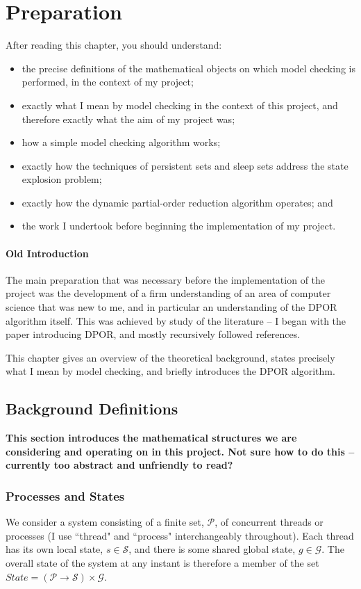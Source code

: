 \documentclass[12pt,a4paper,twoside,openright]{report}
\newenvironment{understandinglist}
	{\begin{itemize} \itemsep 0em}{\end{itemize}}
\begin{document}
\chapter{Preparation}
After reading this chapter,
you should understand:
\begin{understandinglist}
	\item the precise definitions of the
	mathematical objects on which model
	checking is performed, in the context
	of my project;
	\item exactly what I mean by model checking
	in the context of this project, and therefore
	exactly what the aim of my project was;
	\item how a simple model checking algorithm
	works;
	\item exactly how the techniques of persistent sets
	and sleep sets address the state explosion
	problem;
	\item exactly how the dynamic partial-order
	reduction algorithm operates; and
	\item the work I undertook before beginning
	the implementation of my project.
\end{understandinglist}

\subsubsection{Old Introduction}
The main preparation that was necessary before
the implementation of the project was the
development of a firm understanding of an
area of computer science that was new to me,
and in particular an understanding of the
DPOR algorithm itself. This was achieved
by study of the literature -- I began with
the paper introducing DPOR, and mostly
recursively followed references.

This chapter gives an overview of
the theoretical background, states precisely
what I mean by model checking, and briefly
introduces the DPOR algorithm.

\section{Background Definitions} \label{sec:background-defs}
\textbf{This section introduces the mathematical
	structures we are considering and operating on
	in this project.
	Not sure how to do this -- currently too
	abstract and unfriendly to read?}

\subsection{Processes and States}
We consider a system consisting of a finite set, $\mathcal{P}$,
of concurrent threads or processes (I use ``thread" and
``process" interchangeably throughout).
Each thread has its own local state, $s \in \mathcal{S}$, and there
is some shared global state, $g \in \mathcal{G}$. The overall
state of the system at any instant is therefore a member of the set
$ \textit{State} = (\mathcal{P} \to \mathcal{S}) \times \mathcal{G} $.
\end{document}
